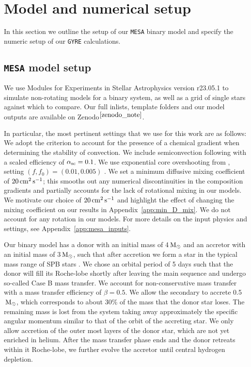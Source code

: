 \documentclass[desactivate]{aa}
\begin{document}
\section{Model and numerical setup} \label{sec:methods}

In this section we outline the setup of our \texttt{MESA} binary model and specify the numeric setup of our \texttt{GYRE} calculations.

\subsection{\texttt{MESA} model setup}\label{sec:model_setup}

We use Modules for Experiments in Stellar Astrophysics \citep[\texttt{MESA},][]{Paxton2011, Paxton2013, Paxton2015, Paxton2018, Paxton2019, Jermyn2023} version r23.05.1 \citep{mesa_zenodo} to simulate non-rotating models for a binary system, as well as a grid of single stars against which to compare. Our full inlists, template folders and our model outputs are available on Zenodo$^{\ref{zenodo_note}}$.


In particular, the most pertinent settings that we use for this work are as follows: We adopt the \citet{Ledoux+1947} criterion to account for the presence of a chemical gradient when determining the stability of convection. We include semiconvection following \citet{Langer+1983} with a scaled efficiency of $\alpha_{\rm sc}=0.1$. We use exponential core overshooting from \cite{Herwig+2000}, setting $(f, f_0) = (0.01, 0.005)$ \citep{Claret+2017}. We set a minimum diffusive mixing coefficient of $20\,{\rm cm^2 \, s^{-1}}$; this smooths out any numerical discontinuities in the composition gradients and partially accounts for the lack of rotational mixing in our models. We motivate our choice of $20\,{\rm cm^2 \, s^{-1}}$ and highlight the effect of changing the mixing coefficient on our results in Appendix~\ref{app:min_D_mix}. We do not account for any rotation in our models. For more details on the input physics and settings, see Appendix~\ref{app:mesa_inputs}. 

Our binary model has a donor with an initial mass of 4$\,{\rm M_\odot}$ and an accretor with an initial mass of 3$\,{\rm M_\odot}$, such that after accretion we form a star in the typical mass range of SPB stars \citep{Waelkens+1985, Waelkens+1991, Kurtz+2022}. We chose an orbital period of 5 days such that the donor will fill its Roche-lobe shortly after leaving the main sequence and undergo so-called Case B mass transfer. We account for non-conservative mass transfer with a mass transfer efficiency of $\beta = 0.5$. We allow the secondary to accrete 0.5$\,{\rm M_\odot}$, which corresponds to about 30\% of the mass that the donor star loses.  The remaining mass is lost from the system taking away approximately the specific angular momentum similar to that of the orbit of the accreting star. We only allow accretion of the outer most layers of the donor star, which are not yet enriched in helium. After the mass transfer phase ends and the donor retreats within it Roche-lobe, we further evolve the accretor until central hydrogen depletion. 
\end{document}
